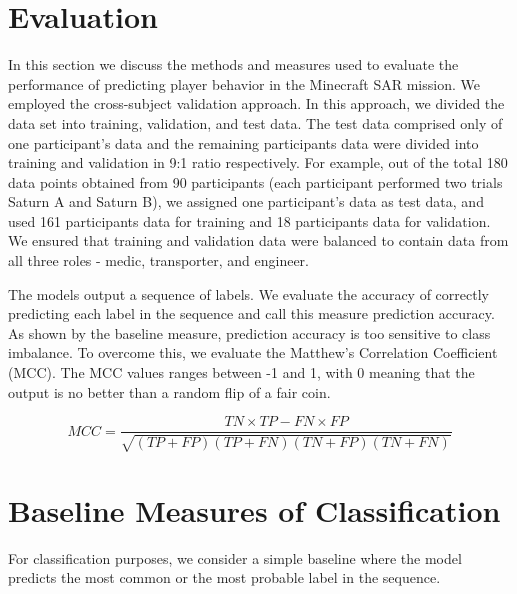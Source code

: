 \documentclass{article}
\begin{document}
\section*{Evaluation}

In this section we discuss the methods and measures used to evaluate the performance of predicting player behavior in the Minecraft SAR mission. We employed the cross-subject validation approach. In this approach, we divided the data set into training, validation, and test data. The test data comprised only of one participant's data and the remaining participants data were divided into training and validation in 9:1 ratio respectively. For example, out of the total 180 data points obtained from 90 participants (each participant performed two trials Saturn A and Saturn B), we assigned one participant's data as test data, and used 161 participants data for training and 18 participants data for validation. We ensured that training and validation data were balanced to contain data from all three roles - medic, transporter, and engineer.

The models output a sequence of labels. We evaluate the accuracy of correctly predicting each label in the sequence and call this measure prediction accuracy. As shown by the baseline measure, prediction accuracy is too sensitive to class imbalance. To overcome this, we evaluate the Matthew's Correlation Coefficient (MCC).
The MCC values ranges between -1 and 1, with 0 meaning that the output is no better than a random flip of a fair coin.
\begin{center}
\[
MCC = \frac{TN \times TP - FN \times FP}{\sqrt{(TP+FP)(TP+FN)(TN+FP)(TN+FN)}}
\]
\end{center}


\section*{Baseline Measures of Classification}
For classification purposes, we consider a simple baseline where the model predicts
the most common or the most probable label in the sequence.

\printbibliography 
\end{document}
